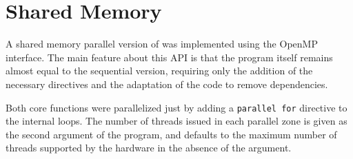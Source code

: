 \section{Shared Memory}
\label{sec:omp}


A shared memory parallel version of \polu was implemented using the OpenMP interface. The main feature about this API is that the program itself remains almost equal to the sequential version, requiring only the addition of the necessary directives and the adaptation of the code to remove dependencies.

Both core functions were parallelized just by adding a \texttt{parallel for} directive to the internal loops. The number of threads issued in each parallel zone is given as the second argument of the program, and defaults to the maximum number of threads supported by the hardware in the absence of the argument.




